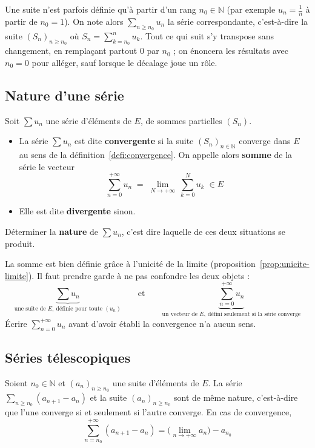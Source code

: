 \begin{remarque}
Une suite n'est parfois définie qu'à partir d'un rang $n_0\in\mathbb{N}$ (par exemple $u_n=\frac{1}{n}$ à partir de $n_0=1$). On note alors $\sum_{n\geq n_0} u_n$ la série correspondante, c'est-à-dire la suite $(S_n)_{n\geq n_0}$ où $S_n=\sum_{k=n_0}^{n} u_k$. Tout ce qui suit s'y transpose sans changement, en remplaçant partout $0$ par $n_0$ ; on énoncera les résultats avec $n_0=0$ pour alléger, sauf lorsque le décalage joue un rôle.
\end{remarque}

\subsection{Nature d'une série}

\begin{defi}
\label{defi:nature-serie}
Soit $\sum u_n$ une série d'éléments de $E$, de sommes partielles $(S_n)$.
\begin{itemize}
\item La série $\sum u_n$ est dite \textbf{convergente} si la suite $(S_n)_{n\in\mathbb{N}}$ converge dans $E$ au sens de la définition~\ref{defi:convergence}. On appelle alors \textbf{somme} de la série le vecteur
\[\sum_{n=0}^{+\infty} u_n \;=\; \lim_{N\to+\infty}\ \sum_{k=0}^{N} u_k \;\in E\]
\item Elle est dite \textbf{divergente} sinon.
\end{itemize}
Déterminer la \textbf{nature} de $\sum u_n$, c'est dire laquelle de ces deux situations se produit.
\end{defi}

\begin{remarque}
La somme est bien définie grâce à l'unicité de la limite (proposition~\ref{prop:unicite-limite}). Il faut prendre garde à ne pas confondre les deux objets :
\[\underbrace{\sum u_n}_{\text{une suite de } E,\ \text{définie pour toute } (u_n)} \qquad\text{et}\qquad \underbrace{\sum_{n=0}^{+\infty}u_n}_{\text{un vecteur de } E,\ \text{défini seulement si la série converge}}\]
Écrire $\sum_{n=0}^{+\infty}u_n$ avant d'avoir établi la convergence n'a aucun sens.
\end{remarque}

\subsection{Séries télescopiques}

\begin{prop}
\label{prop:telescopique}
Soient $n_0\in\mathbb{N}$ et $(a_n)_{n\geq n_0}$ une suite d'éléments de $E$. La série $\displaystyle\sum_{n\geq n_0}(a_{n+1}-a_n)$ et la suite $(a_n)_{n\geq n_0}$ sont de même nature, c'est-à-dire que l'une converge si et seulement si l'autre converge. En cas de convergence,
\[\sum_{n=n_0}^{+\infty}(a_{n+1}-a_n) = \Big(\lim_{n\to+\infty} a_n\Big) - a_{n_0}\]
\end{prop}

